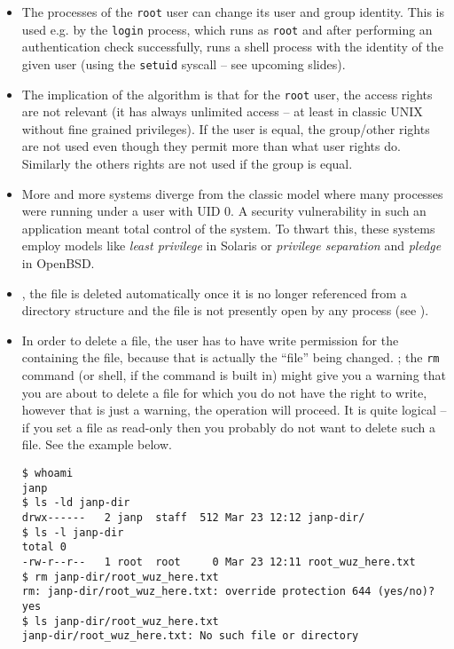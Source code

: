 \begin{itemize}
\item The processes of the \texttt{root} user can change its user and group
identity. This is used e.g. by the \texttt{login} process, which runs as
\texttt{root} and after performing an authentication check successfully, runs
a shell process with the identity of the given user (using the \texttt{setuid} syscall
-- see upcoming slides).
\item The implication of the algorithm is that for the \texttt{root} user, the
access rights are not relevant (it has always unlimited access -- at least in
classic UNIX without fine grained privileges). If the user is equal, the
group/other rights are not used even though they permit more than what user
rights do. Similarly the others rights are not used if the group is equal.
\item More and more systems diverge from the classic model where many processes
were running under a user with UID 0. A security vulnerability in such an
application meant total control of the system. To thwart this, these systems
employ models like \emph{least privilege} in Solaris or \emph{privilege
separation} and \emph{pledge} in OpenBSD.
\item {}, the file is deleted automatically once it is no longer
referenced from a directory structure and the file is not presently open by any
process (see ).
\item {} In order to delete a file, the user has to have write
permission for the  containing the file, because that is actually
the ``file'' being changed. ; the \texttt{rm} command (or shell, if the command is built in)
might give you a warning that you are about to delete a
file for which you do not have the right to write, however that is just a
warning, the operation will proceed.  It is quite logical -- if you set a file
as read-only then you probably do not want to delete such a file.
See the example below.

\begin{verbatim}
$ whoami
janp
$ ls -ld janp-dir
drwx------   2 janp  staff  512 Mar 23 12:12 janp-dir/
$ ls -l janp-dir
total 0
-rw-r--r--   1 root  root     0 Mar 23 12:11 root_wuz_here.txt
$ rm janp-dir/root_wuz_here.txt
rm: janp-dir/root_wuz_here.txt: override protection 644 (yes/no)? yes
$ ls janp-dir/root_wuz_here.txt
janp-dir/root_wuz_here.txt: No such file or directory
\end{verbatim}


\end{itemize}
